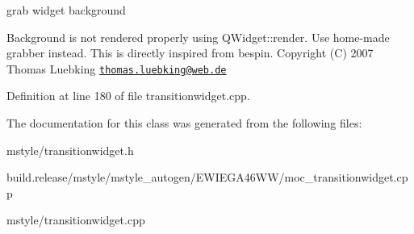 grab widget background 

Background is not rendered properly using Q\+Widget\+::render. Use home-\/made grabber instead. This is directly inspired from bespin. Copyright (C) 2007 Thomas Luebking \href{mailto:thomas.luebking@web.de}{\tt thomas.\+luebking@web.\+de} 

Definition at line 180 of file transitionwidget.\+cpp.



The documentation for this class was generated from the following files\+:\begin{DoxyCompactItemize}
\item 
mstyle/transitionwidget.\+h\item 
build.\+release/mstyle/mstyle\+\_\+autogen/\+E\+W\+I\+E\+G\+A46\+W\+W/moc\+\_\+transitionwidget.\+cpp\item 
mstyle/transitionwidget.\+cpp\end{DoxyCompactItemize}
